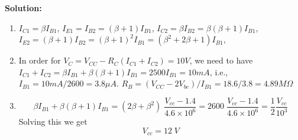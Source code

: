 \begin{enumerate}

{\bf Solution:}

\begin{enumerate}
\item $I_{C1}=\beta I_{B1}$, $I_{E1}=I_{B2}=(\beta+1) I_{B1}$, 
  $I_{C2}=\beta I_{B2}=\beta (\beta+1) I_{B1}$, 
  $I_{E2}=(\beta+1) I_{B2}=(\beta+1)^2 I_{B1}=(\beta^2+2\beta+1)I_{B1}$, 
\item In order for $V_C=V_{CC}-R_C (I_{C1}+I_{C2})=10V$, we need to have
  $I_{C1}+I_{C2}=\beta I_{B1}+\beta (\beta+1) I_{B1}=2500 I_{B1}=10 mA$, i.e.,
  $I_{B1}=10 mA/2600=3.8 \mu A$. 
  $R_B=(V_{CC}-2V_{be})/I_{B1}=18.6/3.8=4.89 M\Omega$
\item 
  \[ \beta I_{B1}+\beta (\beta+1) I_{B1}
  =(2\beta+\beta^2)\;\frac{V_{cc}-1.4}{4.6\times 10^6}
  =2600\;\frac{V_{cc}-1.4}{4.6\times 10^6}=\frac{1}{2}\frac{V_{cc}}{10^3} \]
  Solving this we get
  \[ V_{cc}=12\;V \]
 \end{enumerate}
\end{enumerate}



